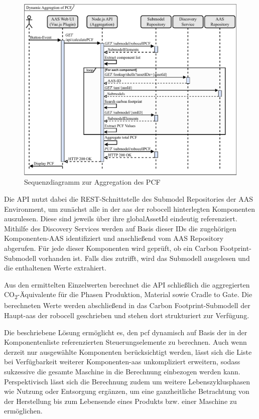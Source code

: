\begin{figure}[htbp]
    \centering
        \includegraphics[width=1\textwidth]{Bilder/DPP/Sequenzdiagramm.pdf}
    
    \caption{Sequenzdiagramm zur Aggregation des PCF}
    \label{fig:SequenzdiagrammPCF}
\end{figure}

Die API nutzt dabei die REST-Schnittstelle des Submodel Repositories der AAS Environment, um zunächst alle in der \acs{aas} der robocell hinterlegten Komponenten auszulesen. 
Diese sind jeweils über ihre globalAssetId eindeutig referenziert. 
Mithilfe des Discovery Services werden auf Basis dieser IDs die zugehörigen Komponenten-AAS identifiziert und anschließend vom AAS Repository abgerufen. 
Für jede dieser Komponenten wird geprüft, ob ein Carbon Footprint-Submodell vorhanden ist. 
Falls dies zutrifft, wird das Submodell ausgelesen und die enthaltenen Werte extrahiert.

Aus den ermittelten Einzelwerten berechnet die API schließlich die aggregierten CO\textsubscript{2}-Äquivalente für die Phasen Produktion, Material sowie Cradle to Gate. 
Die berechneten Werte werden abschließend in das Carbon Footprint-Submodell der Haupt-\acs{aas} der robocell geschrieben und stehen dort strukturiert zur Verfügung.

Die beschriebene Lösung ermöglicht es, den \acs{pcf} dynamisch auf Basis der in der Komponentenliste referenzierten Steuerungselemente zu berechnen. 
Auch wenn derzeit nur ausgewählte Komponenten berücksichtigt werden, lässt sich die Liste bei Verfügbarkeit weiterer Komponenten-\acs{aas} unkompliziert erweitern, sodass sukzessive die gesamte Maschine in die Berechnung einbezogen werden kann. 
Perspektivisch lässt sich die Berechnung zudem um weitere Lebenszyklusphasen wie Nutzung oder Entsorgung ergänzen, um eine ganzheitliche Betrachtung von der Herstellung bis zum Lebensende eines Produkts bzw. einer Maschine zu ermöglichen.

